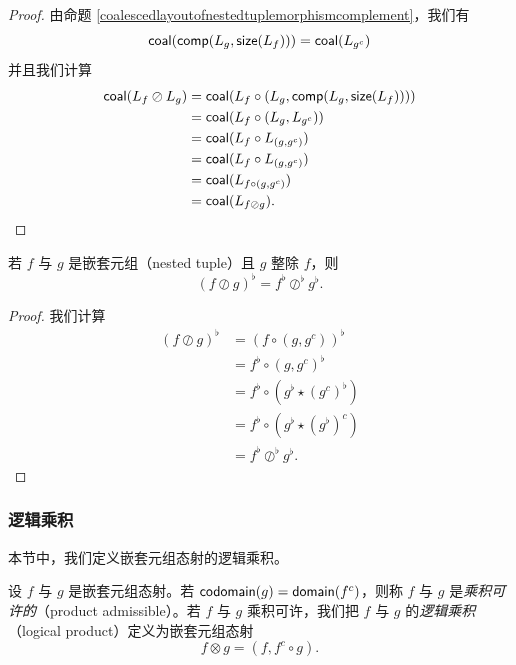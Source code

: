 \begin{proof}
由命题 \ref{coalescedlayoutofnestedtuplemorphismcomplement}，我们有
\[
\mathsf{coal}(\mathsf{comp}(L_g,\mathsf{size}(L_f))) = \mathsf{coal}(L_{g^c})
\]
并且我们计算
    \begin{align*}
        \mathsf{coal}(L_f \oslash L_g) & = \mathsf{coal}(L_f \circ \left(L_g , \mathsf{comp}(L_g,\mathsf{size}(L_f))\right))\\
        & = \mathsf{coal}( L_{f} \circ (L_g, L_{g^c}))\\
        & = \mathsf{coal}(L_{f} \circ L_{(g,g^c)})\\
        & = \mathsf{coal}(L_{f} \circ L_{(g,g^c)})\\
        & = \mathsf{coal}(L_{f \circ (g,g^c)})\\
        & = \mathsf{coal}(L_{f \oslash g}).
    \end{align*}
\end{proof}

\begin{proposition}
    若 $f$ 与 $g$ 是嵌套元组（nested tuple）且 $g$ 整除 $f$，则
    \[
    (f \oslash g)^\flat = f^\flat\oslash^\flat g^\flat.
    \]
\end{proposition}

\begin{proof}
    我们计算
    \begin{align*}
    (f \oslash g)^\flat & = (f \circ (g,g^c))^\flat\\
    & = f^\flat \circ (g,g^c)^\flat\\
    & = f^\flat \circ (g^\flat \star (g^c)^\flat)\\
    & = f^\flat \circ (g^\flat \star (g^\flat)^c)\\
    & = f^\flat \oslash^\flat g^\flat.
    \end{align*}
\end{proof}


\subsubsection{逻辑乘积}
本节中，我们定义嵌套元组态射的逻辑乘积。
\begin{definition}\label{definitionoflogicalproductofnestedtuplemorphisms}
设 $f$ 与 $g$ 是嵌套元组态射。若 $\mathsf{codomain}(g) = \mathsf{domain}(f^c)$，则称 $f$ 与 $g$ 是{\it 乘积可许的}（product admissible）。若 $f$ 与 $g$ 乘积可许，我们把 $f$ 与 $g$ 的{\it 逻辑乘积}（logical product）定义为嵌套元组态射
\[
f \otimes g = (f , f^c \circ g).
\]
\end{definition}




